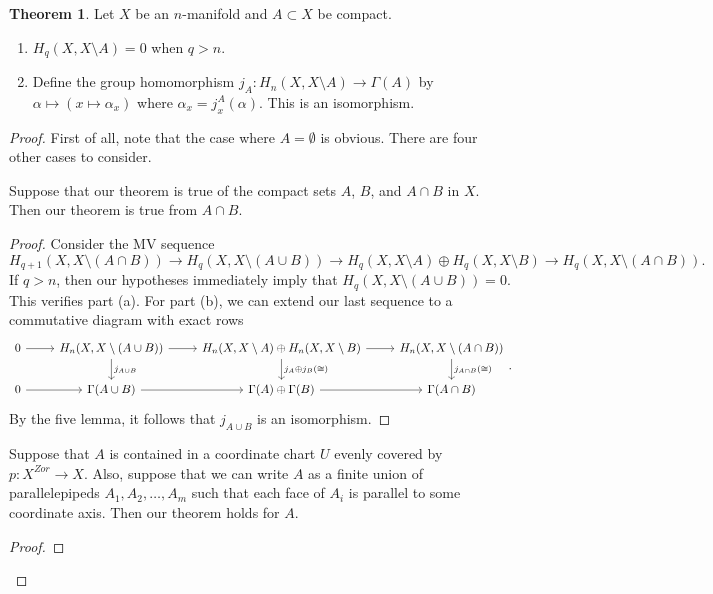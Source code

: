 \documentclass[10pt,letterpaper,cm]{nupset}
\theoremstyle{definition}
\theoremstyle{theorem}
\newtheorem{theorem}[definition]{Theorem}
\theoremstyle{remark}
\newcommand{\1}{\mathbb{1}}
\newcommand{\0}{\vec 0}
\begin{document}
\begin{theorem}
Let $X$ be an $n$-manifold and $A \subset X$ be compact.
\begin{enumerate}[label=(\alph*)]
\item $H_q(X, X \setminus A) =0$ when $q>n$.
\item Define the group homomorphism $j_A : H_n(X, X \setminus A) \to \Gamma(A)$ by $\alpha \mapsto (x \mapsto \alpha_x)$ where $\alpha_x = j_x^A(\alpha)$. This is an isomorphism.
\end{enumerate}
\end{theorem}
\begin{proof}  First of all, note that the case where $A = \emptyset$ is obvious. There are four other cases to consider. 
\begin{steps}
\item Suppose that our theorem is true of the compact sets $A$, $B$, and $A \cap B$ in $X$. Then our theorem is true from $A \cap B$.
\begin{proof}
Consider the MV sequence
\[
{H_{q+1}(X, X \setminus (A \cap B))} \to  {H_q(X, X \setminus (A \cup B))} \to {H_q(X, X \setminus A)\oplus H_q(X, X \setminus B)} \to {H_q(X, X \setminus (A \cap B))}
.\] If $ q>n$, then our hypotheses immediately imply that $H_q(X, X \setminus (A \cup B)) =0$. This verifies part (a). For part (b), we can extend our last sequence to a commutative diagram with exact rows
\[
\begin{tikzcd}
0 \arrow[r] & {H_n(X, X \setminus (A \cup B))} \arrow[r] \arrow[d, "j_{A\cup B}"] & {H_n(X, X \setminus A)\oplus H_n(X, X \setminus B)} \arrow[r] \arrow[d, "j_A \oplus j_B(\cong)"] & {H_n(X, X \setminus (A \cap B))} \arrow[d, "j_{A\cap B}(\cong)"] \\
0 \arrow[r] & \Gamma(A \cup B) \arrow[r]                                        & \Gamma(A) \oplus \Gamma(B) \arrow[r]                                                             & \Gamma(A \cap B)                                              
\end{tikzcd}
.\] By the five lemma, it follows that $j_{A\cup B}$ is an isomorphism. 
\end{proof}
\item Suppose that $A$ is contained in a coordinate chart $U$ evenly covered by $p: X^{Zor} \to X$. Also, suppose that we can write $A$ as a finite union of parallelepipeds $A_1, A_2, \ldots, A_m$ such that each face  of $A_i$ is parallel to some coordinate axis. Then our theorem holds for $A$.
\begin{proof}

\end{proof}
\end{steps}
\end{proof}
\end{document}
